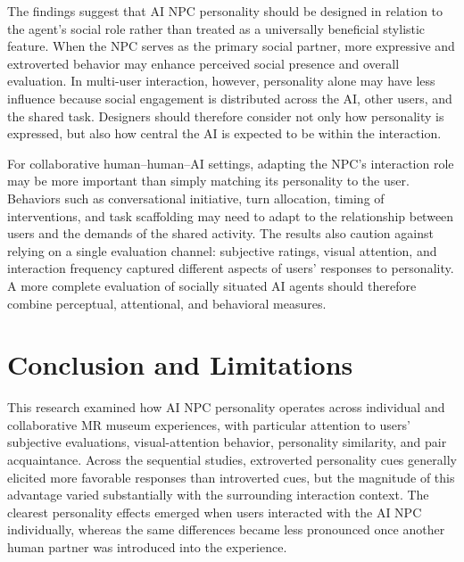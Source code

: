 \documentclass[a4paper,fleqn]{cas-sc}
\begin{document}
The findings suggest that AI NPC personality should be designed in relation to the agent's social role rather than treated as a universally beneficial stylistic feature. When the NPC serves as the primary social partner, more expressive and extroverted behavior may enhance perceived social presence and overall evaluation. In multi-user interaction, however, personality alone may have less influence because social engagement is distributed across the AI, other users, and the shared task. Designers should therefore consider not only how personality is expressed, but also how central the AI is expected to be within the interaction.

For collaborative human--human--AI settings, adapting the NPC's interaction role may be more important than simply matching its personality to the user. Behaviors such as conversational initiative, turn allocation, timing of interventions, and task scaffolding may need to adapt to the relationship between users and the demands of the shared activity. The results also caution against relying on a single evaluation channel: subjective ratings, visual attention, and interaction frequency captured different aspects of users' responses to personality. A more complete evaluation of socially situated AI agents should therefore combine perceptual, attentional, and behavioral measures.

\section{Conclusion and Limitations}

This research examined how AI NPC personality operates across individual and collaborative MR museum experiences, with particular attention to users' subjective evaluations, visual-attention behavior, personality similarity, and pair acquaintance. Across the sequential studies, extroverted personality cues generally elicited more favorable responses than introverted cues, but the magnitude of this advantage varied substantially with the surrounding interaction context. The clearest personality effects emerged when users interacted with the AI NPC individually, whereas the same differences became less pronounced once another human partner was introduced into the experience.
\end{document}
